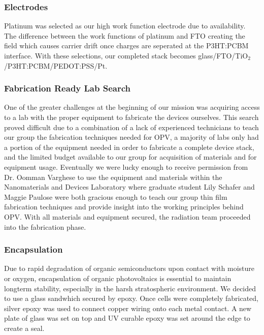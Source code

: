 \subsubsection{Electrodes}
	
	Platinum was selected as our high work function electrode due to availability. The difference between the work functions of platinum and FTO creating the field which causes carrier drift once charges are seperated at the P3HT:PCBM interface. With these selections, our completed stack becomes \linebreak glass/FTO/TiO$_2$/P3HT:PCBM/PEDOT:PSS/Pt.\\
	
\subsubsection{Fabrication Ready Lab Search}
	
	One of the greater challenges at the beginning of our mission was acquiring access to a lab with the proper equipment to fabricate the devices ourselves. This search proved difficult due to a combination of a lack of experienced technicians to teach our group the fabrication techniques needed for OPV, a majority of labs only had a portion of the equipment needed in order to fabricate a complete device stack, and the limited budget available to our group for acquisition of materials and for equipment usage. Eventually we were lucky enough to receive permission from Dr. Oomman Varghese to use the equipment and materials within the Nanomaterials and Devices Laboratory where graduate student Lily Schafer and Maggie Paulose were both gracious enough to teach our group thin film fabrication techniques and provide insight into the working principles behind OPV. With all materials and equipment secured, the radiation team proceeded into the fabrication phase. \\
	
\subsubsection{Encapsulation}

Due to rapid degradation of organic semiconductors upon contact with moisture or oxygen, encapsulation of organic photovoltaics is essential to maintain longterm stability, especially in the harsh stratospheric environment. We decided to use a glass sandwhich secured by epoxy. Once cells were completely fabricated, silver epoxy was used to connect copper wiring onto each metal contact. A new plate of glass was set on top and UV curable epoxy was set around the edge to create a seal.
	
